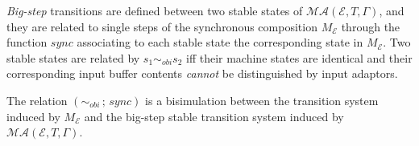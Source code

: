 \emph{Big-step} transitions are defined between two stable states of $\mathcal{MA}(\mathcal{E}, T, \Gamma)$,
and they are related to single steps of the synchronous composition
$M_{\mathcal{E}}$ through the 
%
  function $\mathit{sync}$ 
associating to each stable state  the corresponding state in  $M_{\mathcal{E}}$.
%
Two stable states are related by $s_1 \sim_\mathit{obi} s_2$ iff 
their  machine states are identical
and 
their corresponding input buffer contents \emph{cannot} be
distinguished by input adaptors.  

\begin{theorem}\label{thm:mr-pals}   \cite{mr-pals-journal}
The relation $(\sim_\mathit{obi} \,;\, \mathit{sync})$ 
is a bisimulation between 
the transition system induced by $M_{\mathcal{E}}$
and the big-step stable transition system induced by $\mathcal{MA}(\mathcal{E}, T, \Gamma)$.
\end{theorem}










